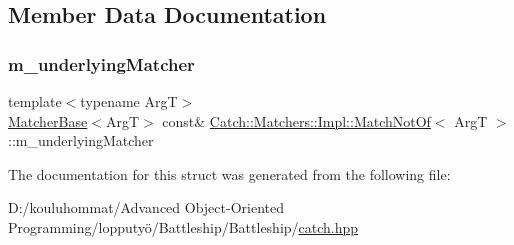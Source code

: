 \subsection{Member Data Documentation}
\mbox{\label{struct_catch_1_1_matchers_1_1_impl_1_1_match_not_of_af7ac67f112b0e93796b048a47329aad4}} 
\subsubsection{\texorpdfstring{m\+\_\+underlying\+Matcher}{m\_underlyingMatcher}}
{\footnotesize\ttfamily template$<$typename ArgT$>$ \\
\mbox{\hyperlink{struct_catch_1_1_matchers_1_1_impl_1_1_matcher_base}{Matcher\+Base}}$<$ArgT$>$ const\& \mbox{\hyperlink{struct_catch_1_1_matchers_1_1_impl_1_1_match_not_of}{Catch\+::\+Matchers\+::\+Impl\+::\+Match\+Not\+Of}}$<$ ArgT $>$\+::m\+\_\+underlying\+Matcher}



The documentation for this struct was generated from the following file\+:\begin{DoxyCompactItemize}
\item 
D\+:/kouluhommat/\+Advanced Object-\/\+Oriented Programming/lopputyö/\+Battleship/\+Battleship/\mbox{\hyperlink{catch_8hpp}{catch.\+hpp}}\end{DoxyCompactItemize}
